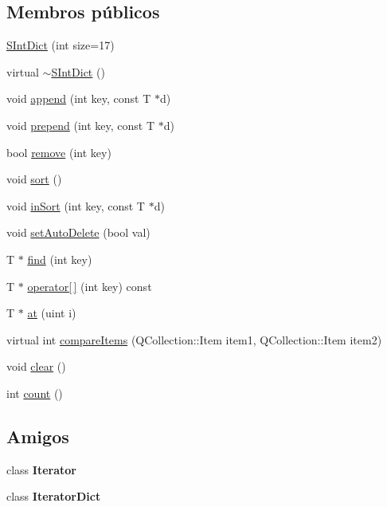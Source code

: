 \subsection*{Membros públicos}
\begin{DoxyCompactItemize}
\item 
\hyperlink{class_s_int_dict_a4eae8cac750feb8ca4393bee3dfba71f}{S\-Int\-Dict} (int size=17)
\item 
virtual \hyperlink{class_s_int_dict_a11c3557fa959cea63a5e682beab5055d}{$\sim$\-S\-Int\-Dict} ()
\item 
void \hyperlink{class_s_int_dict_aa400fb682f9f8729d15b8e251e86147b}{append} (int key, const T $\ast$d)
\item 
void \hyperlink{class_s_int_dict_a4980da54f19e709a462767af9cef85e0}{prepend} (int key, const T $\ast$d)
\item 
bool \hyperlink{class_s_int_dict_acf6e2899927fc38d2bcca0d7ebc611a0}{remove} (int key)
\item 
void \hyperlink{class_s_int_dict_a47fdc9eea42b6975cdc835bb2e08810e}{sort} ()
\item 
void \hyperlink{class_s_int_dict_a6e5a0e6ac53cfeded70eab9966864388}{in\-Sort} (int key, const T $\ast$d)
\item 
void \hyperlink{class_s_int_dict_ab34e68145e7f3a4fc5714c2df25d6718}{set\-Auto\-Delete} (bool val)
\item 
T $\ast$ \hyperlink{class_s_int_dict_ac204b7d40aac2d4adb81bae4a21a02b7}{find} (int key)
\item 
T $\ast$ \hyperlink{class_s_int_dict_a62724e125e886dffbc1f486aedaa6383}{operator\mbox{[}$\,$\mbox{]}} (int key) const 
\item 
T $\ast$ \hyperlink{class_s_int_dict_a6ee1dd34abf45188298cd760033ba59c}{at} (uint i)
\item 
virtual int \hyperlink{class_s_int_dict_aade9045d8c0047e0427d8c6a9c048985}{compare\-Items} (Q\-Collection\-::\-Item item1, Q\-Collection\-::\-Item item2)
\item 
void \hyperlink{class_s_int_dict_ac8bb3912a3ce86b15842e79d0b421204}{clear} ()
\item 
int \hyperlink{class_s_int_dict_a9ba94da7db769b98d02381d872dd9bbb}{count} ()
\end{DoxyCompactItemize}
\subsection*{Amigos}
\begin{DoxyCompactItemize}
\item 
\hypertarget{class_s_int_dict_a9830fc407400559db7e7783cc10a9394}{class {\bfseries Iterator}}\label{class_s_int_dict_a9830fc407400559db7e7783cc10a9394}

\item 
\hypertarget{class_s_int_dict_ab362b5ead75b40c212098db068d50ac7}{class {\bfseries Iterator\-Dict}}\label{class_s_int_dict_ab362b5ead75b40c212098db068d50ac7}

\end{DoxyCompactItemize}


